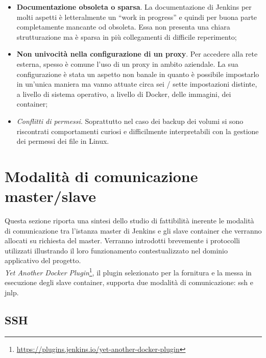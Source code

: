 \begin{itemize}
    \item \textbf{Documentazione obsoleta o sparsa}. La documentazione di Jenkins per molti aspetti è letteralmente un ``work in progress'' e quindi per buona parte completamente mancante od obsoleta. Essa non presenta una chiara strutturazione ma è sparsa in più collegamenti di difficile reperimento;
    \item \textbf{Non univocità nella configurazione di un proxy}. Per accedere alla rete esterna, spesso è comune l'uso di un proxy in ambito aziendale. La sua configurazione è stata un aspetto non banale in quanto è possibile impostarlo in un'unica maniera ma vanno attuate circa sei / sette impostazioni distinte, a livello di sistema operativo, a livello di Docker, delle immagini, dei container;
    \item \textit{Conflitti di permessi}\cite{site:understanding-permissions-in-docker}. Soprattutto nel caso dei backup dei volumi\cite{site:understanding-docker-volumes} si sono riscontrati comportamenti curiosi e difficilmente interpretabili con la gestione dei permessi dei file in \gls{Linux}. 
\end{itemize}

\newpage

\section{Modalità di comunicazione master/slave}

Questa sezione riporta una sintesi dello studio di fattibilità inerente le modalità di comunicazione tra l'istanza \gls{master} di Jenkins e gli \gls{slave} \gls{container} che verranno allocati su richiesta del master\cite{site:jenkins-distributed-builds}. Verranno introdotti brevemente i protocolli utilizzati illustrando il loro funzionamento contestualizzato nel dominio applicativo del progetto. \\

\textit{Yet Another Docker Plugin}\footnote{\url{https://plugins.jenkins.io/yet-another-docker-plugin}}, il \gls{plugin} selezionato per la fornitura e la messa in esecuzione degli slave container, supporta due modalità di comunicazione: \gls{ssh} e \gls{jnlp}.  

\subsection{SSH}
\label{subsec:ssh}

